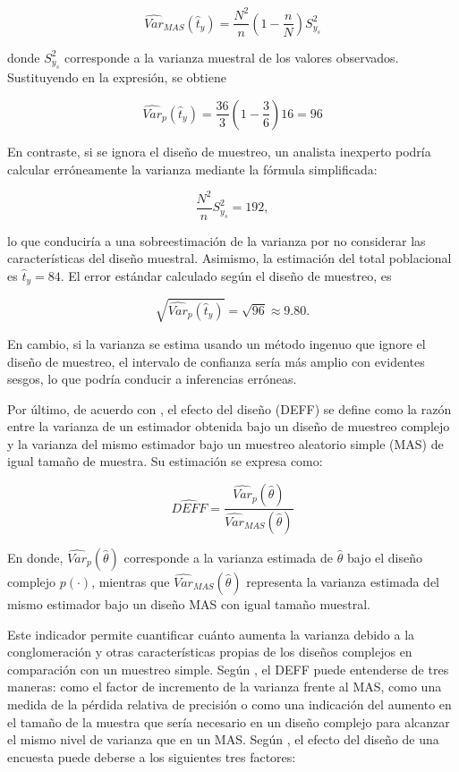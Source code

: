 \documentclass[
  spanish,
  12pt,
]{book}
\begin{document}
\[
\widehat{Var}_{MAS}(\hat{t}_{y}) = \frac{N^2}{n}\left(1-\frac{n}{N}\right)S_{y_s}^2
\]

donde \(S_{y_s}^2\) corresponde a la varianza muestral de los valores observados. Sustituyendo en la expresión, se obtiene

\[
\widehat{Var}_p(\hat{t}_{y}) = \frac{36}{3}\left(1-\frac{3}{6}\right)16 = 96
\]

En contraste, si se ignora el diseño de muestreo, un analista inexperto podría calcular erróneamente la varianza mediante la fórmula simplificada:

\[
\frac{N^2}{n}S_{y_s}^2 = 192,
\]

lo que conduciría a una sobreestimación de la varianza por no considerar las características del diseño muestral. Asimismo, la estimación del total poblacional es \(\hat{t}_{y}=84\). El error estándar calculado según el diseño de muestreo, es

\[
\sqrt{\widehat{Var}_p(\hat{t}_{y})} = \sqrt{96} \approx 9.80.
\]

En cambio, si la varianza se estima usando un método ingenuo que ignore el diseño de muestreo, el intervalo de confianza sería más amplio con evidentes sesgos, lo que podría conducir a inferencias erróneas.

Por último, de acuerdo con \citet[p.~258]{kish1965survey}, el efecto del diseño (DEFF) se define como la razón entre la varianza de un estimador obtenida bajo un diseño de muestreo complejo y la varianza del mismo estimador bajo un muestreo aleatorio simple (MAS) de igual tamaño de muestra. Su estimación se expresa como:

\[
\widehat{{DEFF}} = \frac{\widehat{Var}_{p}(\hat{\theta})}{\widehat{Var}_{MAS}(\hat{\theta})}
\]

En donde, \(\widehat{Var}_{p}(\hat{\theta})\) corresponde a la varianza estimada de \(\hat{\theta}\) bajo el diseño complejo \(p(\cdot)\), mientras que \(\widehat{Var}_{MAS}(\hat{\theta})\)
representa la varianza estimada del mismo estimador bajo un diseño MAS con igual tamaño muestral.

Este indicador permite cuantificar cuánto aumenta la varianza debido a la conglomeración y otras características propias de los diseños complejos en comparación con un muestreo simple. Según \citet[p.~40]{ONUDeff}, el DEFF puede entenderse de tres maneras: como el factor de incremento de la varianza frente al MAS, como una medida de la pérdida relativa de precisión o como una indicación del aumento en el tamaño de la muestra que sería necesario en un diseño complejo para alcanzar el mismo nivel de varianza que en un MAS. Según \citet{Park2003Design}, el efecto del diseño de una encuesta puede deberse a los siguientes tres factores:
\end{document}
